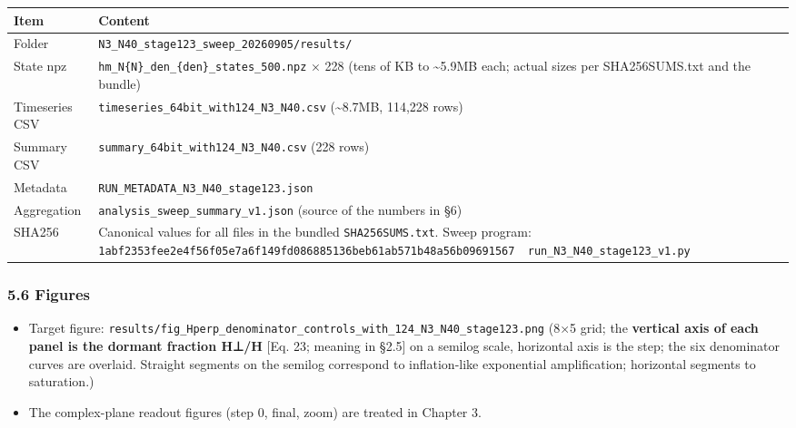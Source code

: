 \documentclass[
  a4paper,
]{ltjsarticle}
\newcounter{none} %
\providecommand{\tightlist}{%
  \setlength{\itemsep}{0pt}\setlength{\parskip}{0pt}}
\begin{document}
{\def\LTcaptype{none} %
\begin{longtable}[]{@{}
  >{\raggedright\arraybackslash}p{}
  >{\raggedright\arraybackslash}p{}@{}}
\toprule\noalign{}
\begin{minipage}[b]{\linewidth}\raggedright
Item
\end{minipage} & \begin{minipage}[b]{\linewidth}\raggedright
Content
\end{minipage} \\
\midrule\noalign{}
\endhead
\bottomrule\noalign{}
\endlastfoot
Folder & \texttt{N3\_N40\_stage123\_sweep\_20260905/results/} \\
State npz & \texttt{hm\_N\{N\}\_den\_\{den\}\_states\_500.npz} × 228
(tens of KB to \textasciitilde5.9MB each; actual sizes per
SHA256SUMS.txt and the bundle) \\
Timeseries CSV & \texttt{timeseries\_64bit\_with124\_N3\_N40.csv}
(\textasciitilde8.7MB, 114,228 rows) \\
Summary CSV & \texttt{summary\_64bit\_with124\_N3\_N40.csv} (228
rows) \\
Metadata & \texttt{RUN\_METADATA\_N3\_N40\_stage123.json} \\
Aggregation & \texttt{analysis\_sweep\_summary\_v1.json} (source of the
numbers in §6) \\
SHA256 & Canonical values for all files in the bundled
\texttt{SHA256SUMS.txt}. Sweep program:
\texttt{1abf2353fee2e4f56f05e7a6f149fd086885136beb61ab571b48a56b09691567\ \ run\_N3\_N40\_stage123\_v1.py} \\
\end{longtable}
}

\subsubsection{5.6 Figures}\label{figures}

\begin{itemize}
\tightlist
\item
  Target figure:
  \texttt{results/fig\_Hperp\_denominator\_controls\_with\_124\_N3\_N40\_stage123.png}
  (8×5 grid; the \textbf{vertical axis of each panel is the dormant
  fraction H⊥/H} {[}Eq. 23; meaning in §2.5{]} on a semilog scale,
  horizontal axis is the step; the six denominator curves are overlaid.
  Straight segments on the semilog correspond to inflation-like
  exponential amplification; horizontal segments to saturation.)
\item
  The complex-plane readout figures (step 0, final, zoom) are treated in
  Chapter 3.
\end{itemize}
\end{document}
